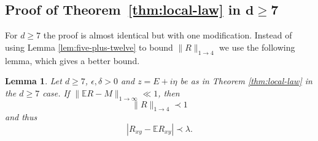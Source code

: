 \documentclass[11pt]{amsart}
\def\Expec{{\mathbb E}}
\newcommand{\ldom}{\prec}
\numberwithin{equation}{section}
\numberwithin{theorem}{section}
\newtheorem{lemma}[theorem]{Lemma}
\begin{document}
\subsection{Proof of Theorem~\ref{thm:local-law} in $\mathbf{d\geq 7}$}

For $d\geq 7$ the proof is almost identical but with one
modification.  Instead of using Lemma \ref{lem:five-plus-twelve} to bound $\|R\|_{1\to 4}$ we use
the following lemma, which gives a better bound.
\begin{lemma}
\label{lem:R-flucs-highd}
Let $d\geq 7$, $\epsilon,\delta>0$ and $z=E+i\eta$ be as in Theorem \ref{thm:local-law} in the $d\geq 7$ case.
If  $\|\mathbb{E}R-M\|_{1\to\infty}\ll 1$, then
\begin{equation}
\label{eq:bootstrapped-1-to-4}
    \|R\|_{1\to 4} \ldom 1
\end{equation}
and thus
\[
|R_{xy} - \Expec R_{xy}| \ldom \lambda.
\]
\end{lemma}
\end{document}
